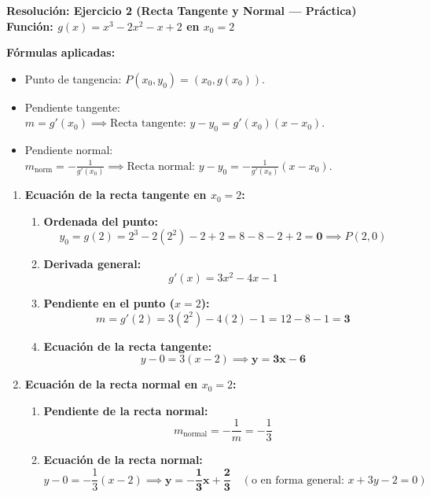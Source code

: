 \documentclass[11pt,a4paper]{article}
\begin{document}
\newpage

\begin{center}
    {\LARGE \textbf{Resolución: Ejercicio 2 (Recta Tangente y Normal — Práctica)}}\\[4pt]
    {\large \textbf{Función: $g(x) = x^3 - 2x^2 - x + 2$ en $x_0 = 2$}}
\end{center}

\vspace{0.3cm}
\begin{tcolorbox}
\textbf{Fórmulas aplicadas:}
\begin{itemize}[leftmargin=1.5em, itemsep=2pt]
    \item Punto de tangencia: $P(x_0, y_0) = (x_0, g(x_0))$.
    \item Pendiente tangente: $m = g'(x_0) \implies \text{Recta tangente: } y - y_0 = g'(x_0)(x - x_0)$.
    \item Pendiente normal: $m_{\text{norm}} = -\frac{1}{g'(x_0)} \implies \text{Recta normal: } y - y_0 = -\frac{1}{g'(x_0)}(x - x_0)$.
\end{itemize}
\end{tcolorbox}

\vspace{0.2cm}
\begin{enumerate}[label=\textbf{\alph*)}, leftmargin=2em, itemsep=8pt]
    \item \textbf{Ecuación de la recta tangente en $x_0 = 2$:}
    \begin{enumerate}[label=\arabic*., leftmargin=1.5em, itemsep=2pt]
        \item \textbf{Ordenada del punto:}
        \[
        y_0 = g(2) = 2^3 - 2(2^2) - 2 + 2 = 8 - 8 - 2 + 2 = \mathbf{0} \implies P(2, 0)
        \]
        \item \textbf{Derivada general:}
        \[
        g'(x) = 3x^2 - 4x - 1
        \]
        \item \textbf{Pendiente en el punto ($x = 2$):}
        \[
        m = g'(2) = 3(2^2) - 4(2) - 1 = 12 - 8 - 1 = \mathbf{3}
        \]
        \item \textbf{Ecuación de la recta tangente:}
        \[
        y - 0 = 3(x - 2) \implies \mathbf{y = 3x - 6}
        \]
    \end{enumerate}

    \item \textbf{Ecuación de la recta normal en $x_0 = 2$:}
    \begin{enumerate}[label=\arabic*., leftmargin=1.5em, itemsep=2pt]
        \item \textbf{Pendiente de la recta normal:}
        \[
        m_{\text{normal}} = -\frac{1}{m} = -\frac{1}{3}
        \]
        \item \textbf{Ecuación de la recta normal:}
        \[
        y - 0 = -\frac{1}{3}(x - 2) \implies \mathbf{y = -\frac{1}{3}x + \frac{2}{3}} \quad (\text{o en forma general: } x + 3y - 2 = 0)
        \]
    \end{enumerate}
\end{enumerate}
\end{document}
